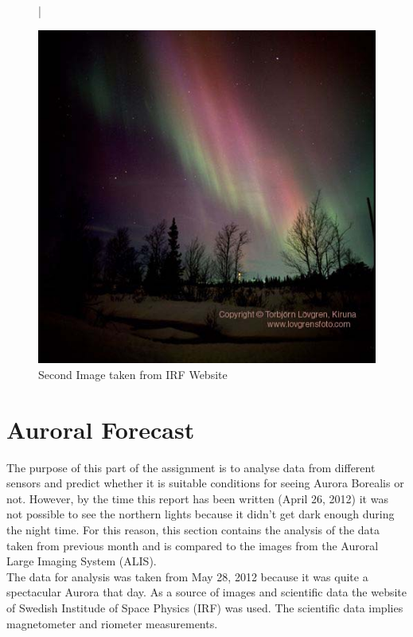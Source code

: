 \documentclass{article}
\begin{document}
\begin{figure}[htbp!]
\centering|
\centerline{\includegraphics[scale=2]{Figures/awowa2.jpg}}
\caption{Second Image taken from IRF Website}
\label{fig:Awowa2}
\end{figure}


\section{Auroral Forecast}

The purpose of this part of the assignment is to analyse data from different sensors and predict whether it is suitable conditions for seeing Aurora Borealis or not. However, by the time this report has been written (April 26, 2012) it was not possible to see the northern lights because it didn't get dark enough during the night time. For this reason, this section contains the analysis of the data taken from previous month and is compared to the images from the Auroral Large Imaging System (ALIS).
\\
The data for analysis was taken from May 28, 2012 because it was quite a spectacular Aurora that day. As a source of images and scientific data the website of Swedish Institude of Space Physics (IRF) was used. The scientific data implies magnetometer and riometer measurements.
\end{document}
